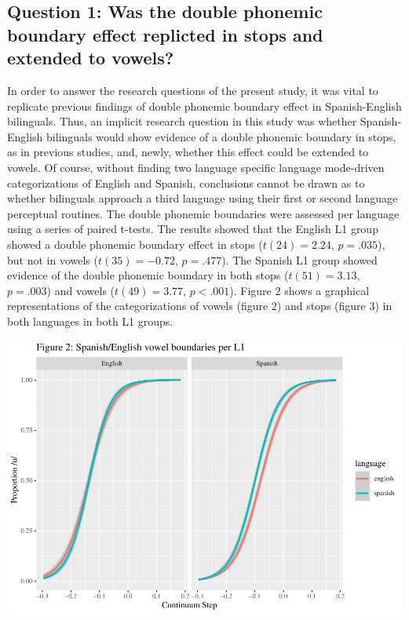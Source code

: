 \documentclass[
  english,
  man]{apa6}
\begin{document}
\hypertarget{question-1-was-the-double-phonemic-boundary-effect-replicted-in-stops-and-extended-to-vowels}{%
\subsection{Question 1: Was the double phonemic boundary effect replicted in stops and extended to vowels?}\label{question-1-was-the-double-phonemic-boundary-effect-replicted-in-stops-and-extended-to-vowels}}

In order to answer the research questions of the present study, it was vital to replicate previous findings of double phonemic boundary effect in Spanish-English bilinguals. Thus, an implicit research question in this study was whether Spanish-English bilinguals would show evidence of a double phonemic boundary in stops, as in previous studies, and, newly, whether this effect could be extended to vowels. Of course, without finding two language specific language mode-driven categorizations of English and Spanish, conclusions cannot be drawn as to whether bilinguals approach a third language using their first or second language perceptual routines. The double phonemic boundaries were assessed per language using a series of paired t-tests. The results showed that the English L1 group showed a double phonemic boundary effect in stops (\(t(24) = 2.24\), \(p = .035\)), but not in vowels (\(t(35) = -0.72\), \(p = .477\)). The Spanish L1 group showed evidence of the double phonemic boundary in both stops (\(t(51) = 3.13\), \(p = .003\)) and vowels (\(t(49) = 3.77\), \(p < .001\)). Figure 2 shows a graphical representations of the categorizations of vowels (figure 2) and stops (figure 3) in both languages in both L1 groups.

\includegraphics{master_files/figure-latex/unnamed-chunk-5-1.pdf}
\end{document}
